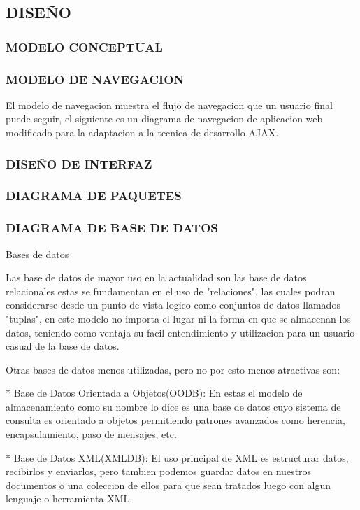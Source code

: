 \subsection{DISEÑO}
\subsubsection{MODELO CONCEPTUAL}

\subsubsection{MODELO DE NAVEGACION}

El modelo de navegacion muestra el flujo de navegacion que un usuario final puede seguir, el siguiente es un diagrama de navegacion de aplicacion web modificado para la adaptacion a la tecnica de desarrollo AJAX.


\subsubsection{DISEÑO DE INTERFAZ}


\subsubsection{DIAGRAMA DE PAQUETES}


\subsubsection{DIAGRAMA DE BASE DE DATOS}

Bases de datos

Las base de datos de mayor uso en la actualidad son las base de datos relacionales estas se fundamentan en el uso de "relaciones", las cuales podran considerarse desde un punto de vista logico como conjuntos de datos llamados "tuplas", en este modelo no importa el lugar ni la forma en que se almacenan los datos, teniendo como ventaja su facil entendimiento y utilizacion para un usuario casual de la base de datos.

Otras bases de datos menos utilizadas, pero no por esto menos atractivas son:

* Base de Datos Orientada a Objetos(OODB): En estas el modelo de almacenamiento como su nombre lo dice es una base de datos cuyo sistema de consulta es orientado a objetos permitiendo patrones avanzados como herencia, encapsulamiento, paso de mensajes, etc.

* Base de Datos XML(XMLDB): El uso principal de XML es estructurar datos, recibirlos y enviarlos, pero tambien podemos guardar datos en nuestros documentos o una coleccion de ellos para que sean tratados luego con algun lenguaje o herramienta XML.

